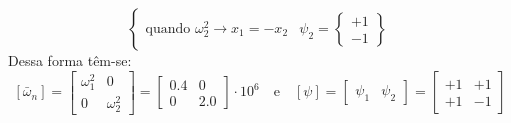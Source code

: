 \documentclass{article}
\begin{document}
\begin{resolution}
\begin{equation*}
\begin{cases}
            \text{quando } \omega_2^2 \to x_1 = -x_2 & \psi_2 = \begin{Bmatrix} +1\\ -1\end{Bmatrix}
        \end{cases}
    \end{equation*}
    Dessa forma têm-se:
    \begin{equation}
        \boxed{
            [\bar{\omega}_n] = 
            \begin{bmatrix} \omega_1^2 & 0\\ 0 & \omega_2^2\end{bmatrix} = 
            \begin{bmatrix} 0.4 & 0\\ 0 & 2.0\end{bmatrix} \cdot 10^6
        }
        \quad\text{e}\quad
        \boxed{
            [\psi] = 
            \begin{bmatrix} \psi_1 & \psi_2\end{bmatrix} = 
            \begin{bmatrix} +1 & +1\\ +1 & -1\end{bmatrix}
        }
    \end{equation}
\end{resolution}
\end{document}
